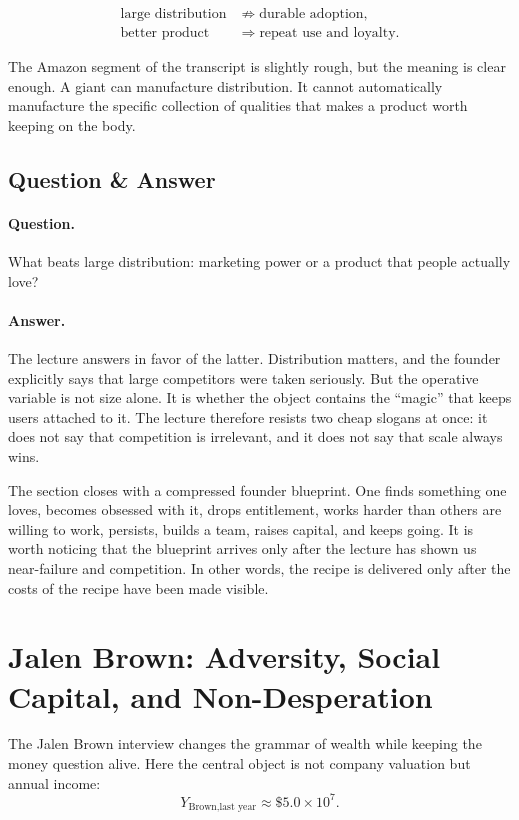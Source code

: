 \begin{align}
\text{large distribution} &\not\Rightarrow \text{durable adoption},\\
\text{better product} &\Rightarrow \text{repeat use and loyalty}.
\end{align}

The Amazon segment of the transcript is slightly rough, but the meaning is clear enough. A giant can manufacture distribution. It cannot automatically manufacture the specific collection of qualities that makes a product worth keeping on the body.

\subsection{Question \& Answer}

\paragraph{Question.} What beats large distribution: marketing power or a product that people actually love?

\paragraph{Answer.} The lecture answers in favor of the latter. Distribution matters, and the founder explicitly says that large competitors were taken seriously. But the operative variable is not size alone. It is whether the object contains the ``magic'' that keeps users attached to it. The lecture therefore resists two cheap slogans at once: it does not say that competition is irrelevant, and it does not say that scale always wins.

The section closes with a compressed founder blueprint. One finds something one loves, becomes obsessed with it, drops entitlement, works harder than others are willing to work, persists, builds a team, raises capital, and keeps going. It is worth noticing that the blueprint arrives only after the lecture has shown us near-failure and competition. In other words, the recipe is delivered only after the costs of the recipe have been made visible.

\section{Jalen Brown: Adversity, Social Capital, and Non-Desperation}

The Jalen Brown interview changes the grammar of wealth while keeping the money question alive. Here the central object is not company valuation but annual income:
\begin{equation}
Y_{\text{Brown,last year}} \approx \$5.0 \times 10^7.
\end{equation}


